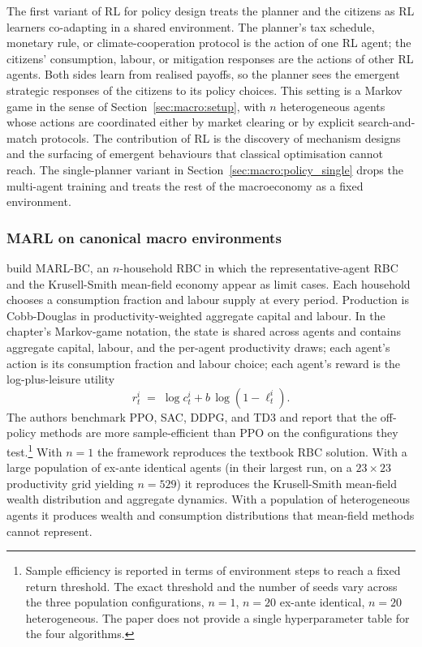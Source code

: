The first variant of RL for policy design treats the planner and the
citizens as RL learners co-adapting in a shared environment. The
planner's tax schedule, monetary rule, or climate-cooperation
protocol is the action of one RL agent; the citizens' consumption,
labour, or mitigation responses are the actions of other RL agents.
Both sides learn from realised payoffs, so the planner sees the
emergent strategic responses of the citizens to its policy choices.
This setting is a Markov game in the sense of
Section~\ref{sec:macro:setup}, with $n$ heterogeneous agents whose
actions are coordinated either by market clearing or by explicit
search-and-match protocols. The contribution of RL is the discovery
of mechanism designs and the surfacing of emergent behaviours that
classical optimisation cannot reach. The single-planner variant in
Section~\ref{sec:macro:policy_single} drops the multi-agent training
and treats the rest of the macroeconomy as a fixed environment.

\subsubsection{MARL on canonical macro environments}
\label{sec:macro:marl-rbc}

\citet{Gabriele2026marlbc} build MARL-BC, an $n$-household RBC in
which the representative-agent RBC and the Krusell-Smith mean-field
economy appear as limit cases. Each household chooses a consumption
fraction and labour supply at every period. Production is
Cobb-Douglas in productivity-weighted aggregate capital and labour.
In the chapter's Markov-game notation, the state is shared across
agents and contains aggregate capital, labour, and the per-agent
productivity draws; each agent's action is its consumption fraction
and labour choice; each agent's reward is the log-plus-leisure
utility
\begin{equation}
r^i_t \;=\; \log c^i_t + b\,\log(1 - \ell^i_t).
\label{eq:macro:marl-bc-reward}
\end{equation}
The authors benchmark PPO, SAC, DDPG, and TD3 and report that the
off-policy methods are more sample-efficient than PPO on the
configurations they
test.\footnote{Sample efficiency is reported in terms of environment
steps to reach a fixed return threshold. The exact threshold and the
number of seeds vary across the three population configurations,
$n=1$, $n=20$ ex-ante identical, $n=20$ heterogeneous. The paper
does not provide a single hyperparameter table for the four
algorithms.} With $n = 1$ the framework reproduces the textbook RBC
solution. With a large population of ex-ante identical agents (in
their largest run, on a $23 \times 23$ productivity grid yielding
$n = 529$) it reproduces the Krusell-Smith mean-field wealth
distribution and aggregate dynamics. With a population of
heterogeneous agents it produces wealth and consumption distributions
that mean-field methods cannot represent.

